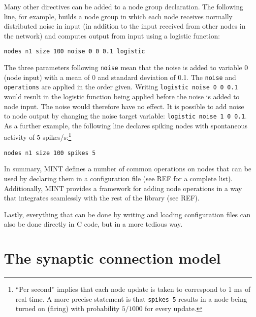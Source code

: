 \documentclass[12pt,letterpaper]{memoir}
\newcommand{\mint}{MINT\xspace}
\begin{document}
Many other directives can be added to a node group declaration. The
following line, for example, builds a node group in which each node
receives normally distributed noise in input (in addition to the input
received from other nodes in the network) and computes output from input using a logistic function:
\begin{lstlisting}
nodes n1 size 100 noise 0 0 0.1 logistic
\end{lstlisting}
The three parameters following \lstinline{noise} mean that the noise
is added to variable 0 (node input) with a mean of 0 and standard
deviation of 0.1. The \lstinline{noise} and \lstinline{operations} are
applied in the order given. Writing \lstinline{logistic noise 0 0 0.1}
would result in the logistic function being applied before the noise
is added to node input. The noise would therefore have no effect. It
is possible to add noise to node output by changing the noise target
variable: \lstinline{logistic noise 1 0 0.1}. As a further example,
the following line declares spiking nodes with spontaneous activity of
5 spikes/s:\footnote{``Per second'' implies that each node update is
  taken to correspond to 1 ms of real time. A more precise statement
  is that \lstinline{spikes 5} results in a node being turned on
  (firing) with probability $5/1000$ for every update.}
\begin{lstlisting}
nodes n1 size 100 spikes 5
\end{lstlisting}
In summary, \mint defines a number of common operations on nodes that
can be used by declaring them in a configuration file (see REF for a
complete list). Additionally, \mint provides a framework for adding
node operations in a way that integrates seamlessly with the rest of
the library (see REF).

Lastly, everything that can be done by writing and loading
configuration files can also be done directly in C code, but in a more
tedious way.

\section{The synaptic connection model}
\end{document}
